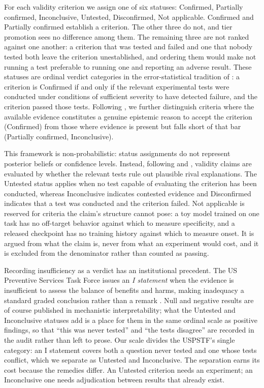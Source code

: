 \documentclass{article}
\begin{document}
For each validity criterion we assign one of six statuses: Confirmed, Partially confirmed, Inconclusive, Untested, Disconfirmed, Not applicable. Confirmed and Partially confirmed establish a criterion. The other three do not, and tier promotion sees no difference among them. The remaining three are not ranked against one another: a criterion that was tested and failed and one that nobody tested both leave the criterion unestablished, and ordering them would make not running a test preferable to running one and reporting an adverse result. These statuses are ordinal verdict categories in the error-statistical tradition of \citet{mayo1996error, mayo2018statistical}: a criterion is Confirmed if and only if the relevant experimental tests were conducted under conditions of sufficient severity to have detected failure, and the criterion passed those tests. Following \citet{achinstein2001book}, we further distinguish criteria where the available evidence constitutes a genuine epistemic reason to accept the criterion (Confirmed) from those where evidence is present but falls short of that bar (Partially confirmed, Inconclusive).

This framework is non-probabilistic: status assignments do not represent posterior beliefs or confidence levels. Instead, following \citet{campbell1963experimental} and \citet{cook1979quasi}, validity claims are evaluated by whether the relevant tests rule out plausible rival explanations. The Untested status applies when no test capable of evaluating the criterion has been conducted, whereas Inconclusive indicates contested evidence and Disconfirmed indicates that a test was conducted and the criterion failed. Not applicable is reserved for criteria the claim’s structure cannot pose: a toy model trained on one task has no off-target behavior against which to measure specificity, and a released checkpoint has no training history against which to measure onset. It is argued from what the claim is, never from what an experiment would cost, and it is excluded from the denominator rather than counted as passing.

Recording insufficiency as a verdict has an institutional precedent. The US Preventive Services Task Force issues an \emph{I statement} when the evidence is insufficient to assess the balance of benefits and harms, making inadequacy a standard graded conclusion rather than a remark \citep{uspstf2021}. Null and negative results are of course published in mechanistic interpretability; what the Untested and Inconclusive statuses add is a place for them in the same ordinal scale as positive findings, so that ``this was never tested'' and ``the tests disagree'' are recorded in the audit rather than left to prose. Our scale divides the USPSTF's single category: an I statement covers both a question never tested and one whose tests conflict, which we separate as Untested and Inconclusive. The separation earns its cost because the remedies differ. An Untested criterion needs an experiment; an Inconclusive one needs adjudication between results that already exist.
\end{document}
